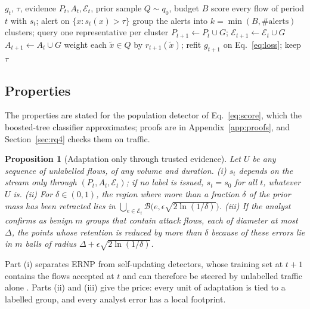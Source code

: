 \documentclass[a4paper,fleqn]{cas-dc}
\newcommand{\ERNP}{ERNP\xspace}
\newcommand{\E}{\mathcal{E}}
\newtheorem{proposition}{Proposition}
\begin{document}
\begin{algorithm}[t]
\caption{\ERNP, one period $t$}\label{alg:ernp}
\small
\begin{algorithmic}[1]
\Require $g_t$, $\tau$, evidence $P_t,A_t,\E_t$, prior sample $Q\sim q_0$, budget $B$
\State score every flow of period $t$ with $s_t$; alert on $\{x: s_t(x)>\tau\}$
\State group the alerts into $k=\min(B,\#\text{alerts})$ clusters; query one representative per cluster
   $P_{t+1}\gets P_t\cup G$; $\E_{t+1}\gets\E_t\cup G$
  \Else\ $A_{t+1}\gets A_t\cup G$
  \EndIf
\EndFor
\State weight each $\tilde x\in Q$ by $r_{t+1}(\tilde x)$; refit $g_{t+1}$ on Eq.~\eqref{eq:loss}; keep $\tau$
\end{algorithmic}
\end{algorithm}

\subsection{Properties}
\label{sec:properties}
The properties are stated for the population detector of Eq.~\eqref{eq:score}, which the boosted-tree classifier approximates; proofs are in Appendix~\ref{app:proofs}, and Section~\ref{sec:rq4} checks them on traffic.

\begin{proposition}[Adaptation only through trusted evidence]\label{prop:p1}
Let $U$ be any sequence of unlabelled flows, of any volume and duration.
(i) $s_t$ depends on the stream only through $(P_t,A_t,\E_t)$; if no label is issued, $s_t=s_0$ for all $t$, whatever $U$ is.
(ii) For $\delta\in(0,1)$, the region where more than a fraction $\delta$ of the prior mass has been retracted lies in $\bigcup_{e\in\E_t}\mathcal B\big(e,\epsilon\sqrt{2\ln(1/\delta)}\big)$.
(iii) If the analyst confirms as benign $m$ groups that contain attack flows, each of diameter at most $\Delta$, the points whose retention is reduced by more than $\delta$ \emph{because of these errors} lie in $m$ balls of radius $\Delta+\epsilon\sqrt{2\ln(1/\delta)}$.
\end{proposition}

Part (i) separates \ERNP from self-updating detectors, whose training set at $t+1$ contains the flows accepted at $t$ and can therefore be steered by unlabelled traffic alone \cite{kloft2012security}. Parts (ii) and (iii) give the price: every unit of adaptation is tied to a labelled group, and every analyst error has a local footprint.
\end{document}
